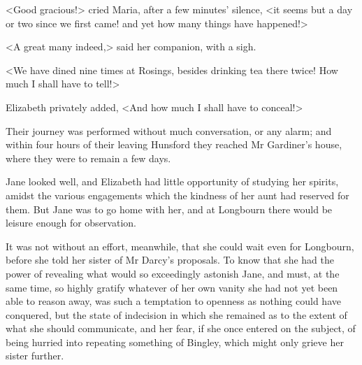 <Good gracious!> cried Maria, after a few minutes' silence, <it seems but a day or two since we first came! and yet how many things have happened!>

<A great many indeed,> said her companion, with a sigh.

<We have dined nine times at Rosings, besides drinking tea there twice! How much I shall have to tell!>

Elizabeth privately added, <And how much I shall have to conceal!>

Their journey was performed without much conversation, or any alarm; and within four hours of their leaving Hunsford they reached Mr Gardiner's house, where they were to remain a few days.

Jane looked well, and Elizabeth had little opportunity of studying her spirits, amidst the various engagements which the kindness of her aunt had reserved for them. But Jane was to go home with her, and at Longbourn there would be leisure enough for observation.

It was not without an effort, meanwhile, that she could wait even for Longbourn, before she told her sister of Mr Darcy's proposals. To know that she had the power of revealing what would so exceedingly astonish Jane, and must, at the same time, so highly gratify whatever of her own vanity she had not yet been able to reason away, was such a temptation to openness as nothing could have conquered, but the state of indecision in which she remained as to the extent of what she should communicate, and her fear, if she once entered on the subject, of being hurried into repeating something of Bingley, which might only grieve her sister further.